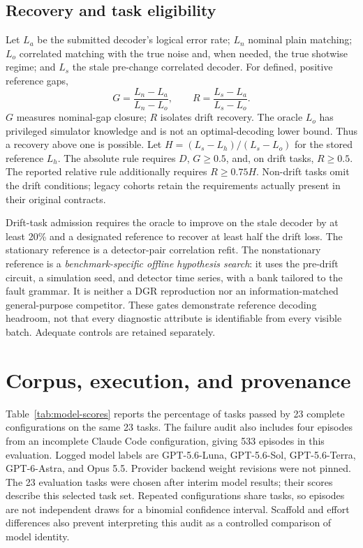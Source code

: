 \documentclass{article}
\begin{document}
\subsection{Recovery and task eligibility}
Let $L_a$ be the submitted decoder's logical error rate; $L_n$ nominal plain matching; $L_o$ correlated matching with the true noise and, when needed, the true shotwise regime; and $L_s$ the stale pre-change correlated decoder. For defined, positive reference gaps,
\begin{equation}
G=\frac{L_n-L_a}{L_n-L_o},\qquad
R=\frac{L_s-L_a}{L_s-L_o}.
\label{eq:gaps}
\end{equation}
$G$ measures nominal-gap closure; $R$ isolates drift recovery. The oracle $L_o$ has privileged simulator knowledge and is not an optimal-decoding lower bound. Thus a recovery above one is possible. Let $H=(L_s-L_h)/(L_s-L_o)$ for the stored reference $L_h$. The absolute rule requires $D$, $G\geq0.5$, and, on drift tasks, $R\geq0.5$. The reported relative rule additionally requires $R\geq0.75H$. Non-drift tasks omit the drift conditions; legacy cohorts retain the requirements actually present in their original contracts.

Drift-task admission requires the oracle to improve on the stale decoder by at least 20\% and a designated reference to recover at least half the drift loss. The stationary reference is a detector-pair correlation refit. The nonstationary reference is a \emph{benchmark-specific offline hypothesis search}: it uses the pre-drift circuit, a simulation seed, and detector time series, with a bank tailored to the fault grammar. It is neither a DGR reproduction nor an information-matched general-purpose competitor. These gates demonstrate reference decoding headroom, not that every diagnostic attribute is identifiable from every visible batch. Adequate controls are retained separately.

\section{Corpus, execution, and provenance}

Table~\ref{tab:model-scores} reports the percentage of tasks passed by 23 complete configurations on the same 23 tasks. The failure audit also includes four episodes from an incomplete Claude Code configuration, giving 533 episodes in this evaluation. Logged model labels are GPT-5.6-Luna, GPT-5.6-Sol, GPT-5.6-Terra, GPT-6-Astra, and Opus 5.5. Provider backend weight revisions were not pinned. The 23 evaluation tasks were chosen after interim model results; their scores describe this selected task set. Repeated configurations share tasks, so episodes are not independent draws for a binomial confidence interval. Scaffold and effort differences also prevent interpreting this audit as a controlled comparison of model identity.
\end{document}
